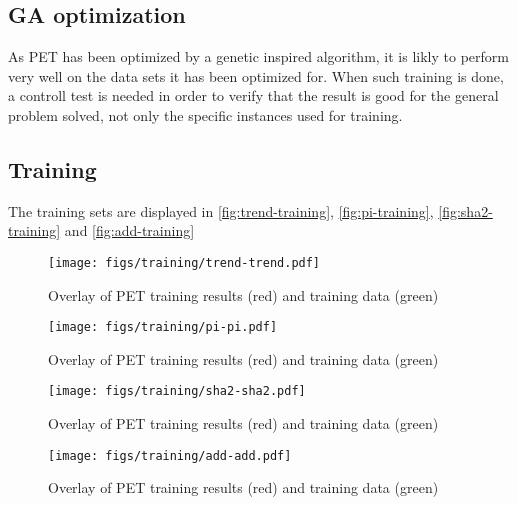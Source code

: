 \subsection{GA optimization}
As PET has been optimized by a genetic inspired algorithm, it is likly to perform very well on the data sets it
has been optimized for. When such training is done, a controll test is needed in order to verify that the result
is good for the general problem solved, not only the specific instances used for training.

\subsection{Training}

The training sets are displayed in \autoref{fig:trend-training},
\autoref{fig:pi-training}, \autoref{fig:sha2-training} and
\autoref{fig:add-training}

\begin{figure}[ht]
\centering
\texttt{[image: figs/training/trend-trend.pdf]}
\caption{Overlay of PET training results (red) and training data (green)}
\label{fig:trend-training}
\end{figure}
\begin{figure}[ht]
\centering
\texttt{[image: figs/training/pi-pi.pdf]}
\caption{Overlay of PET training results (red) and training data (green)}
\label{fig:pi-training}
\end{figure}
\begin{figure}[ht]
\centering
\texttt{[image: figs/training/sha2-sha2.pdf]}
\caption{Overlay of PET training results (red) and training data (green)}
\label{fig:sha2-training}
\end{figure}
\begin{figure}[ht]
\centering
\texttt{[image: figs/training/add-add.pdf]}
\caption{Overlay of PET training results (red) and training data (green)}
\label{fig:add-training}
\end{figure}

